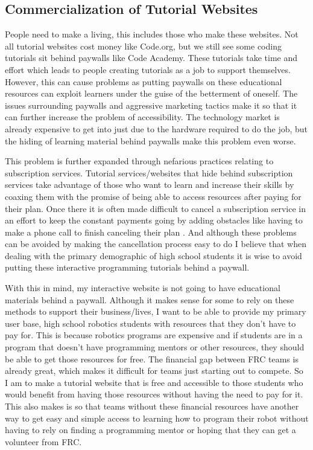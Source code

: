 \documentclass[10pt,twocolumn]{article}
\begin{document}
\subsection{Commercialization of Tutorial Websites}
People need to make a living, this includes those who make these websites. Not all tutorial websites cost money like Code.org, but we still see some coding tutorials sit behind paywalls like Code Academy. These tutorials take time and effort which leads to people creating tutorials as a job to support themselves. However, this can cause problems as putting paywalls on these educational resources can exploit learners under the guise of the betterment of oneself. The issues surrounding paywalls and aggressive marketing tactics make it so that it can further increase the problem of accessibility. The technology market is already expensive to get into just due to the hardware required to do the job, but the hiding of learning material behind paywalls make this problem even worse. 

This problem is further expanded through nefarious practices relating to subscription services. Tutorial services/websites that hide behind subscription services take advantage of those who want to learn and increase their skills by coaxing them with the promise of being able to access resources after paying for their plan. Once there it is often made difficult to cancel a subscription service in an effort to keep the constant payments going by adding obstacles like having to make a phone call to finish canceling their plan \cite{sheil_staying_2024}. And although these problems can be avoided by making the cancellation process easy to do I believe that when dealing with the primary demographic of high school students it is wise to avoid putting these interactive programming tutorials behind a paywall.

With this in mind, my interactive website is not going to have educational materials behind a paywall. Although it makes sense for some to rely on these methods to support their business/lives, I want to be able to provide my primary user base, high school robotics students with resources that they don't have to pay for. This is because robotics programs are expensive and if students are in a program that doesn't have programming mentors or other resources, they should be able to get those resources for free. The financial gap between FRC teams is already great, which makes it difficult for teams just starting out to compete. So I am to make a tutorial website that is free and accessible to those students who would benefit from having those resources without having the need to pay for it. This also makes is so that teams without these financial resources have another way to get easy and simple access to learning how to program their robot without having to rely on finding a programming mentor or hoping that they can get a volunteer from FRC. 
\end{document}
